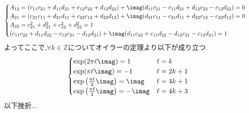 \documentclass[dvipdfmx,titlepage, 11pt, a4paper]{jsarticle}%
\begin{document}
\begin{itemize}
\begin{align*}
\begin{cases}
            A_{12} = (c_{11}c_{21} + d_{11}d_{21} + c_{12}c_{22} + d_{12}d_{22}) + \imag (d_{11}c_{21} -  c_{11}d_{21} + d_{12}c_{22} - c_{12}d_{22}) = 0\\
            A_{21} = (c_{21}c_{11} + d_{21}d_{11} + c_{22}c_{12} + d_{22}d_{12}) + \imag(d_{21}c_{11} - c_{21}d_{11} + d_{22}c_{12} - c_{22}d_{12}) = 0\\
            A_{22} = c_{21}^{2} + d_{21}^{2} + c_{22}^{2} + d_{22}^{2} = 1\\
            (c_{11}c_{22} + d_{11}d_{22} - c_{12}c_{21} - d_{12}d_{21}) + \imag (d_{11}c_{22} + c_{11}d_{22} - d_{12}c_{21} - c_{12}d_{21}) = 1
        \end{cases}
    \end{align*}
    よってここで,$\forall k \in \mathbb{Z}$についてオイラーの定理より以下が成り立つ.
    \begin{align*}
        \begin{cases}
            \exp(2\pi\ell\imag) = 1 & \ell = k\\
            \exp(\pi\ell\imag) = -1 & \ell = 2k + 1\\
            \exp\left(\frac{\pi\ell}{2}\imag\right)  = \imag & \ell = 4k + 1\\
            \exp\left(\frac{\pi\ell}{2}\imag\right)  = -\imag & \ell = 4k + 3\\
        \end{cases}
    \end{align*}
    以下挫折...
\end{itemize}
\end{document}
